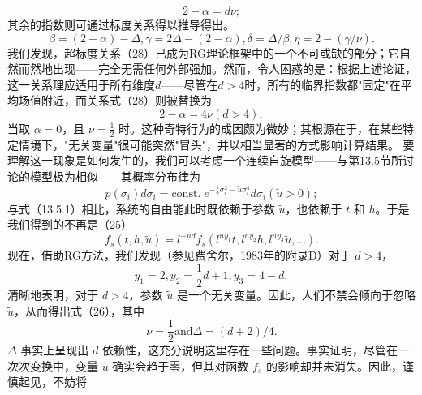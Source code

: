 \begin{equation}\tag{14.3.23}\label{eq:14.3.23}
2 - \alpha = d \nu ;
\end{equation}
其余的指数则可通过标度关系得以推导得出。
\begin{equation}\tag{14.3.24}\label{eq:14.3.24}
\beta = ( 2 - \alpha ) - \Delta ,  \gamma = 2 \Delta - ( 2 - \alpha ) ,  \delta = \Delta / \beta ,  \eta = 2 - ( \gamma / \nu ) .
\end{equation}
我们发现，超标度关系（28）已成为RG理论框架中的一个不可或缺的部分；它自然而然地出现——完全无需任何外部强加。然而，令人困惑的是：根据上述论证，这一关系理应适用于所有维度\(d\)——尽管在\(d > 4\)时，所有的临界指数都"固定"在平均场值附近，而关系式（28）则被替换为
\begin{equation}\tag{14.3.25}\label{eq:14.3.25}
2 - \alpha = 4 \nu  ( d > 4 ) ,
\end{equation}
当取 \(\alpha = 0\)，且 \(\nu = \frac{1}{2}\) 时。这种奇特行为的成因颇为微妙；其根源在于，在某些特定情境下，"无关变量"很可能突然"冒头"，并以相当显著的方式影响计算结果。
要理解这一现象是如何发生的，我们可以考虑一个连续自旋模型——与第13.5节所讨论的模型极为相似——其概率分布律为
\begin{equation}\tag{14.3.26}\label{eq:14.3.26}
p ( \sigma _ { i } ) d \sigma _ { i } = \mathrm { c o n s t . } \; e ^{- \frac { 1} { 2 } \sigma _ { i } ^{2} - \tilde { u } \sigma _ { i } ^{4} } d \sigma _ { i }  ( \tilde { u } > 0 ) ;
\end{equation}
与式（13.5.1）相比，系统的自由能此时既依赖于参数 \(\tilde{u}\)，也依赖于 \(t\) 和 \(h\)。于是我们得到的不再是（25）
\begin{equation}\tag{14.3.27}\label{eq:14.3.27}
f _ { s } ( t , h , \tilde { u } ) = l ^{- n d} f _ { s } \left( l ^{n y _ { 1} } t , l ^{n y _ { 2} } h , l ^{n y _ { 3} } \tilde { u } , \ldots \right) .
\end{equation}
现在，借助RG方法，我们发现（参见费舍尔，1983年的附录D）对于 \(d > 4\)，
\begin{equation}\tag{14.3.28}\label{eq:14.3.28}
y _ { 1 } = 2 ,  y _ { 2 } = \frac { 1 } { 2 } d + 1 ,  y _ { 3 } = 4 - d ,
\end{equation}
清晰地表明，对于 \(d > 4\)，参数 \(\tilde{u}\) 是一个无关变量。因此，人们不禁会倾向于忽略 \(\tilde{u}\)，从而得出式（26），其中
\begin{equation}\tag{14.3.29}\label{eq:14.3.29}
\nu = \frac { 1 } { 2 }  \mathrm { a n d }  \Delta = ( d + 2 ) / 4 .
\end{equation}
\(\Delta\) 事实上呈现出 \(d\) 依赖性，这充分说明这里存在一些问题。事实证明，尽管在一次次变换中，变量 \(\tilde{u}\) 确实会趋于零，但其对函数 \(f_{s}\) 的影响却并未消失。因此，谨慎起见，不妨将
